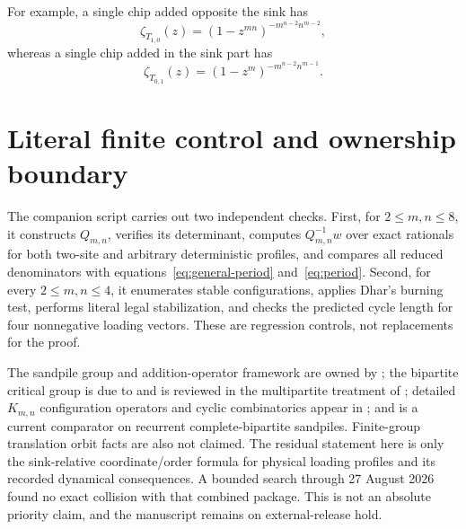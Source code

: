 \documentclass[11pt,a4paper]{amsart}
\theoremstyle{definition}
\theoremstyle{remark}
\begin{document}
For example, a single chip added opposite the sink has
\[
 \zeta_{T_{1,0}}(z)
 =(1-z^{mn})^{-m^{n-2}n^{m-2}},
\]
whereas a single chip added in the sink part has
\[
 \zeta_{T_{0,1}}(z)
 =(1-z^{m})^{-m^{n-2}n^{m-1}}.
\]

\section{Literal finite control and ownership boundary}

The companion script carries out two independent checks.  First, for
$2\leq m,n\leq8$, it constructs $Q_{m,n}$, verifies its determinant,
computes $Q_{m,n}^{-1}w$ over exact rationals for both two-site and
arbitrary deterministic profiles, and compares all reduced denominators with
equations~\eqref{eq:general-period} and~\eqref{eq:period}.
Second, for every $2\leq m,n\leq4$, it enumerates stable configurations,
applies Dhar's burning test, performs literal legal stabilization, and checks
the predicted cycle length for four nonnegative loading vectors.  These are
regression controls, not replacements for the proof.

The sandpile group and addition-operator framework are owned by
\citet{Dhar1990,DharEtAl1995}; the bipartite critical group is due to
\citet{Lorenzini1991} and is reviewed in the multipartite treatment of
\citet{JacobsonEtAl2003}; detailed $K_{m,n}$ configuration operators and
cyclic combinatorics appear in \citet{AvalEtAl2016}; and
\citet{SeligZhu2025} is a current comparator on recurrent complete-bipartite
sandpiles.  Finite-group translation orbit facts are also not claimed.  The
residual statement here is only the sink-relative coordinate/order formula
for physical loading profiles and its recorded dynamical consequences.  A
bounded search through 27 August 2026 found no exact collision with that
combined package.  This is not an absolute priority claim, and the manuscript
remains on external-release hold.



\end{document}
